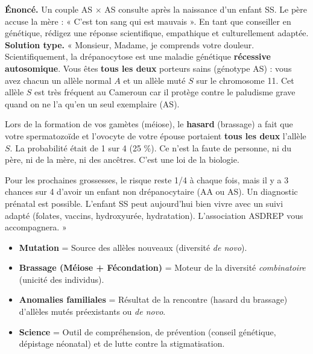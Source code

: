 \documentclass[11pt]{article}
\begin{document}
\begin{exoresolu}
\textbf{Énoncé.} Un couple AS $\times$ AS consulte après la naissance d'un enfant SS. Le père accuse la mère : « C'est ton sang qui est mauvais ». En tant que conseiller en génétique, rédigez une réponse scientifique, empathique et culturellement adaptée.
\tcblower
\textbf{Solution type.}
« Monsieur, Madame, je comprends votre douleur. Scientifiquement, la drépanocytose est une maladie génétique \textbf{récessive autosomique}. Vous êtes \textbf{tous les deux} porteurs sains (génotype AS) : vous avez chacun un allèle normal $A$ et un allèle muté $S$ sur le chromosome 11. Cet allèle $S$ est très fréquent au Cameroun car il protège contre le paludisme grave quand on ne l'a qu'en un seul exemplaire (AS).
\par Lors de la formation de vos gamètes (méiose), le \textbf{hasard} (brassage) a fait que votre spermatozoïde et l'ovocyte de votre épouse portaient \textbf{tous les deux} l'allèle $S$. La probabilité était de 1 sur 4 (25 \%). Ce n'est la faute de personne, ni du père, ni de la mère, ni des ancêtres. C'est une loi de la biologie.
\par Pour les prochaines grossesses, le risque reste 1/4 à chaque fois, mais il y a 3 chances sur 4 d'avoir un enfant non drépanocytaire (AA ou AS). Un diagnostic prénatal est possible. L'enfant SS peut aujourd'hui bien vivre avec un suivi adapté (folates, vaccins, hydroxyurée, hydratation). L'association ASDREP vous accompagnera. »
\end{exoresolu}

\begin{aretenir}
\begin{itemize}
    \item \textbf{Mutation} = Source des allèles nouveaux (diversité \emph{de novo}).
    \item \textbf{Brassage (Méiose + Fécondation)} = Moteur de la diversité \emph{combinatoire} (unicité des individus).
    \item \textbf{Anomalies familiales} = Résultat de la rencontre (hasard du brassage) d'allèles mutés préexistants ou \emph{de novo}.
    \item \textbf{Science} = Outil de compréhension, de prévention (conseil génétique, dépistage néonatal) et de lutte contre la stigmatisation.
\end{itemize}
\end{aretenir}
\end{document}
